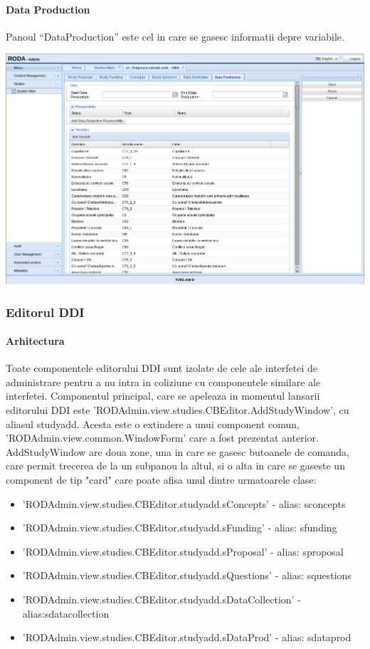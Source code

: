 \paragraph{Data Production}


Panoul “DataProduction” este cel in care se gasesc informatii depre variabile. 

\includegraphics[width=16cm]{img/studyedit-dataproduction}


\subsubsection{Editorul DDI}




\paragraph{Arhitectura}

Toate componentele editorului DDI sunt izolate de cele ale interfetei de administrare pentru a nu intra in coliziune cu componentele similare ale interfetei. Componentul principal, care se apeleaza in momentul lansarii editorului DDI este 'RODAdmin.view.studies.CBEditor.AddStudyWindow', cu aliasul studyadd. Acesta este o extindere a unui component comun, 'RODAdmin.view.common.WindowForm' care a fost prezentat anterior. AddStudyWindow are doua zone, una in care se gasesc butoanele de comanda, care permit trecerea de la un subpanou la altul, si o alta in care se gaseste un component de tip "card" care poate afisa unul dintre urmatoarele clase: 

\begin{itemize}
\item 'RODAdmin.view.studies.CBEditor.studyadd.sConcepts' - alias: sconcepts
\item 'RODAdmin.view.studies.CBEditor.studyadd.sFunding' - alias: sfunding
\item 'RODAdmin.view.studies.CBEditor.studyadd.sProposal' - alias: sproposal
\item 'RODAdmin.view.studies.CBEditor.studyadd.sQuestions' - alias: squestions
\item 'RODAdmin.view.studies.CBEditor.studyadd.sDataCollection' - alias:sdatacollection 
\item 'RODAdmin.view.studies.CBEditor.studyadd.sDataProd' - alias: sdataprod
\end{itemize}

